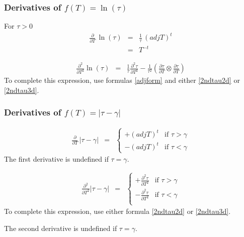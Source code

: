 \documentclass{report}
\begin{document}
\subsubsection{Derivatives of $f(T)=\ln(\tau)$}

For $\tau>0$
\begin{eqnarray}
\frac{\partial}{\partial T} \, \ln(\tau) & = & \frac{1}{\tau} \, (adj T)^t \\
 & = & T^{-t}
\end{eqnarray}

\begin{eqnarray}
\frac{\partial^2}{\partial T^2} \ln(\tau) & = & \frac{1}{\tau} \frac{\partial^2 \tau}{\partial T^2} - \frac{1}{\tau^2} \left( \frac{\partial \tau}{\partial T} \otimes \frac{\partial \tau}{\partial T} \right)
\end{eqnarray}
To complete this expression, use formulas \ref{adjform} and either 
\ref{2ndtau2d} or \ref{2ndtau3d}. \newline

\subsubsection{Derivatives of $f(T)=|\tau-\gamma|$ \label{abstau}}

\begin{eqnarray}
\frac{\partial}{\partial T} \, |\tau-\gamma| & = & \left\{ \begin{array}{cc} 
+(adj T)^t & \mbox{if $\tau> \gamma$} \\
-(adj T)^t & \mbox{if $\tau< \gamma$}
\end{array} \right.
\end{eqnarray}
The first derivative is undefined if $\tau=\gamma$. \newline

\begin{eqnarray}
\frac{\partial^2}{\partial T^2} |\tau-\gamma| & = & \left\{ \begin{array}{cc} 
+\frac{\partial^2 \tau}{\partial T^2} & \mbox{if $\tau>\gamma$} \\
-\frac{\partial^2 \tau}{\partial T^2} & \mbox{if $\tau<\gamma$} \\
\end{array} \right.
\end{eqnarray}
To complete this expression, use either formula 
\ref{2ndtau2d} or \ref{2ndtau3d}. \newline

\noindent The second derivative is undefined if $\tau=\gamma$. \newline
\end{document}

